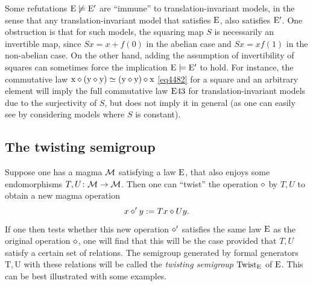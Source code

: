   Some refutations $\mathrm{E} \not\models {\mathrm{E}'}$ are ``immune'' to translation-invariant models, in the sense that any translation-invariant model that satisfies $\mathrm{E}$, also satisfies ${\mathrm{E}'}$.  One obstruction is that for such models, the squaring map $S$ is necessarily an invertible map, since $Sx = x + f(0)$ in the abelian case and $Sx = xf(1)$ in the non-abelian case. On the other hand, adding the assumption of invertibility of squares can sometimes force the implication $\mathrm{E} \models {\mathrm{E}'}$ to hold.  For instance, the commutative law $\mathrm{x} \diamond (\mathrm{y} \diamond \mathrm{y}) \simeq (\mathrm{y} \diamond \mathrm{y}) \diamond \mathrm{x}$ \eqref{eq4482} for a square and an arbitrary element will imply the full commutative law $\mathrm{E}43$ for translation-invariant models due to the surjectivity of $S$, but does not imply it in general (as one can easily see by considering models where $S$ is constant).

\subsection{The twisting semigroup}\label{twisting-sec}

Suppose one has a magma ${\mathcal{M}}$ satisfying a law $\mathrm{E}$, that also enjoys some endomorphisms $T, U \colon {\mathcal{M}} \to {\mathcal{M}}$.  Then one can ``twist'' the operation $\diamond$ by $T,U$ to obtain a new magma operation
\begin{equation}\label{twist} x \diamond' y := Tx \diamond Uy.
\end{equation}
If one then tests whether this new operation $\diamond'$ satisfies the same law $\mathrm{E}$ as the original operation $\diamond$, one will find that this will be the case provided that $T,U$ satisfy a certain set of relations.  The semigroup generated by formal generators $\mathrm{T}, \mathrm{U}$ with these relations will be called the \emph{twisting semigroup} $\operatorname{Twist}_{\mathrm{E}}$ of $\mathrm{E}$.  This can be best illustrated with some examples.

